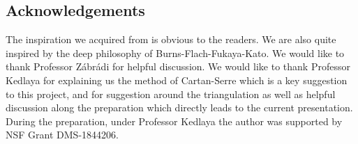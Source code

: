 \documentclass[12pt]{amsart}
\newtheorem{proposition}[theorem]{Proposition}
\newtheorem{conjecture}[theorem]{Conjecture}
\theoremstyle{definition}
\numberwithin{equation}{section}
\begin{document}
%
%
%
%
%
%
%
%
%
%
%






\newpage


\subsection*{Acknowledgements} 

The inspiration we acquired from \cite{CKZ18} is obvious to the readers. We are also quite inspired by the deep philosophy of Burns-Flach-Fukaya-Kato. We would like to thank Professor Z\'abr\'adi for helpful discussion. We would like to thank Professor Kedlaya for explaining us the method of Cartan-Serre which is a key suggestion to this project, and for suggestion around the triangulation as well as helpful discussion along the preparation which directly leads to the current presentation. During the preparation, under Professor Kedlaya the author was supported by NSF Grant DMS-1844206.
\end{document}
